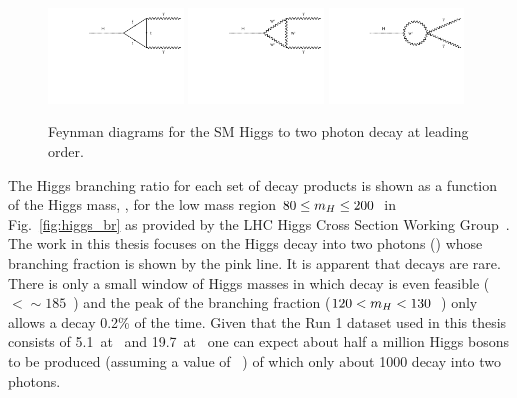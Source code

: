 \begin{figure}
  \includegraphics[width=0.32\textwidth]{theory/plots/Htgg.pdf}
  \includegraphics[width=0.32\textwidth]{theory/plots/HWgg.pdf}
  \includegraphics[width=0.32\textwidth]{theory/plots/HWgg4.pdf}
  \caption{Feynman diagrams for the \acs{SM} Higgs to two photon decay at leading order.}
  \label{fig:feyn_hgg_decay}
\end{figure}


The \SM Higgs branching ratio for each set of decay products is shown as a function of the Higgs mass, \mH, for the low mass region $80\leq m_{H}\leq 200$~\GeV in Fig.~\ref{fig:higgs_br} as provided by the LHC Higgs Cross Section Working Group~\cite{LHCHiggsCrossSectionWorkingGroup3}. The work in this thesis focuses on the Higgs decay into two photons (\Hgg) whose branching fraction is shown by the pink line. It is apparent that \Hgg decays are rare. There is only a small window of Higgs masses in which \Hgg decay is even feasible (\mH$<\sim185$~\GeV) and the peak of the branching fraction ($120<m_{H}<130$~\GeV) only allows a \SM \Hgg decay 0.2\% of the time. Given that the \LHC Run 1 dataset used in this thesis consists of 5.1~\fbinv at ~\TeV and 19.7~\fbinv at ~\TeV one can expect about half a million \SM Higgs bosons to be produced (assuming a value of ~\GeV) of which only about 1000 decay into two photons. 

